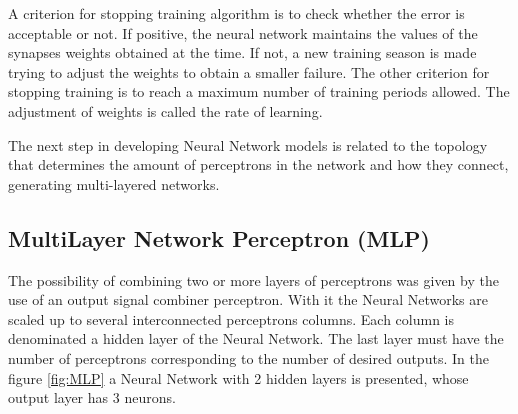             A criterion for stopping training algorithm is to check whether the error is acceptable or not. If positive, the neural network maintains the values of the synapses weights obtained at the time. If not, a new training season is made trying to adjust the weights to obtain a smaller failure.
            The other criterion for stopping training is to reach a maximum number of training periods allowed. The adjustment of weights is called the rate of learning.
            
            The next step in developing Neural Network models is related to the topology that determines the amount of perceptrons in the network and how they connect, generating multi-layered networks.        
    
        \subsection{MultiLayer Network Perceptron (MLP)}
    
            The possibility of combining two or more layers of perceptrons was given by the use of an output signal combiner perceptron. With it the Neural Networks are scaled up to several interconnected perceptrons columns. Each column is denominated a hidden layer of the Neural Network. The last layer must have the number of perceptrons corresponding to the number of desired outputs. In the figure \ref{fig:MLP} a Neural Network with 2 hidden layers is presented, whose output layer has 3 neurons.
            
            \begin{figure}[ht]
            \end{figure}
            
